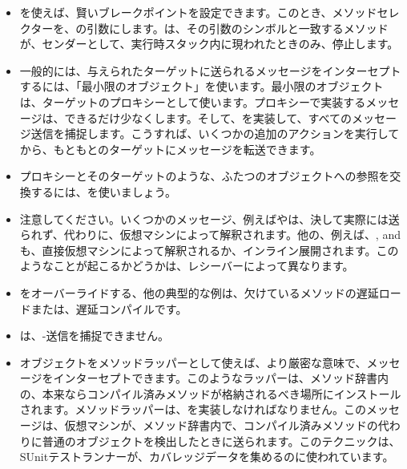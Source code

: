 \documentclass[a4paper,10pt,twoside]{book}
\begin{document}
\begin{itemize}
\item {}を使えば、賢いブレークポイントを設定できます。このとき、メソッドセレクターを、の引数にします。は、その引数のシンボルと一致するメソッドが、センダーとして、実行時スタック内に現われたときのみ、停止します。
\item 一般的には、与えられたターゲットに送られるメッセージをインターセプトするには、「最小限のオブジェクト」を使います。最小限のオブジェクトは、ターゲットのプロキシーとして使います。プロキシーで実装するメッセージは、できるだけ少なくします。そして、を実装して、すべてのメッセージ送信を捕捉します。こうすれば、いくつかの追加のアクションを実行してから、もともとのターゲットにメッセージを転送できます。
\item プロキシーとそのターゲットのような、ふたつのオブジェクトへの参照を交換するには、を使いましょう。
\item 注意してください。いくつかのメッセージ、例えばやは、決して実際には送られず、代わりに、仮想マシンによって解釈されます。他の、例えば、\ct{+}, \ct{-} and  も、直接仮想マシンによって解釈されるか、インライン展開されます。このようなことが起こるかどうかは、レシーバーによって異なります。
\item {}をオーバーライドする、他の典型的な例は、欠けているメソッドの遅延ロードまたは、遅延コンパイルです。
\item {}は、\self-送信を捕捉できません。
\item オブジェクトをメソッドラッパーとして使えば、より厳密な意味で、メッセージをインターセプトできます。このようなラッパーは、メソッド辞書内の、本来ならコンパイル済みメソッドが格納されるべき場所にインストールされます。メソッドラッパーは、を実装しなければなりません。このメッセージは、仮想マシンが、メソッド辞書内で、コンパイル済みメソッドの代わりに普通のオブジェクトを検出したときに送られます。このテクニックは、SUnitテストランナーが、カバレッジデータを集めるのに使われています。
\end{itemize}

\ifx\wholebook\relax\else
   
   
\end{document}
